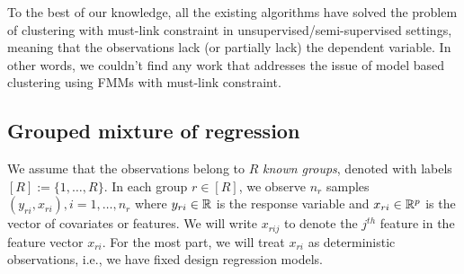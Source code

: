 \documentclass[12pt]{article}
\begin{document}
To the best of our knowledge, all the existing algorithms have solved the problem of clustering with must-link constraint in unsupervised/semi-supervised settings, meaning that the observations lack (or partially lack) the dependent variable. In other words, we couldn't find any work that addresses the issue of model based clustering using FMMs  with must-link constraint.

\subsection{Grouped mixture of regression}\label{sec:model}
We assume that the observations belong to $R$ \emph{known groups}, denoted with labels $[R] := \{1,\dots,R\}$. In each group $r \in [R]$, we observe $n_r$ samples $(y_{ri},x_{ri}), i=1,\dots,n_r$ where $y_{ri} \in \mathbb{R}$ is the response variable and $x_{ri} \in \mathbb{R}^p$ is the vector of covariates or features.  We will write $x_{rij}$ to denote the $j^{th}$ feature in the feature vector $x_{ri}$. For the most part, we will treat $x_{ri}$ as deterministic observations, i.e., we have fixed design regression models.
\end{document}
